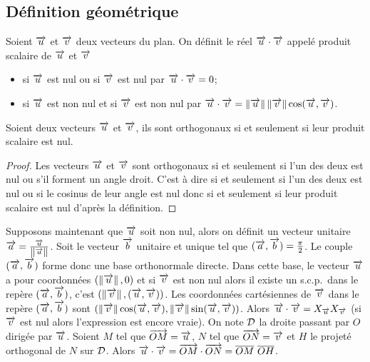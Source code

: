\subsection{Définition géométrique}
\begin{defdef}
  Soient $\vu$ et $\vv$ deux vecteurs du plan. On définit le réel $\vu \cdot \vv$ appelé produit scalaire de $\vu$ et $\vv$ 
  \begin{itemize}
  \item si $\vu$ est nul ou si $\vv$ est nul par $\vu \cdot \vv=0$;
  \item si $\vu$ est non nul et si $\vv$ est non nul par $\vu \cdot \vv=\norme{\vu}\norme{\vv}\cos(\vu, \vv)$.
  \end{itemize}
\end{defdef}
\begin{prop}
   Soient deux vecteurs $\vu$ et $\vv$, ils sont orthogonaux si et seulement si leur produit scalaire est nul.
\end{prop}
\begin{proof}
Les vecteurs $\vu$ et $\vv$ sont orthogonaux si et seulement si l'un des deux est nul ou s'il forment un angle droit. C'est à dire si et seulement si l'un des deux est nul ou si le cosinus de leur angle est nul donc si et seulement si leur produit scalaire est nul d'après la définition.
\end{proof}

Supposons maintenant que $\vu$ soit non nul, alors on définit un vecteur unitaire $\vect{a}=\frac{\vu}{\norme{\vu}}$. Soit le vecteur $\vect{b}$ unitaire et unique tel que $(\vect{a},\vect{b})=\frac{\pi}{2}$. Le couple $(\vect{a},\vect{b})$ forme donc une base orthonormale directe. Dans cette base, le vecteur $\vu$ a pour coordonnées $(\norme{\vu},0)$ et si $\vv$ est non nul alors il existe un s.c.p.\ dans le repère $(\vect{a},\vect{b})$, c'est $(\norme{\vv}, (\vu,\vv))$. Les coordonnées cartésiennes de $\vv$ dans le repère $(\vect{a},\vect{b})$ sont $(\norme{\vv}\cos(\vu,\vv),\norme{\vv}\sin(\vu,\vv))$. Alors $\vu \cdot \vv=X_{\vu}X_{\vv}$ (si $\vv$ est nul alors l'expression est encore vraie). On note $\Dr$ la droite passant par $O$ dirigée par $\vu$. Soient $M$ tel que $\vect{OM}=\vu$, $N$ tel que $\vect{ON}=\vv$ et $H$ le projeté orthogonal de $N$ sur $\Dr$. Alors $\vu \cdot \vv=\vect{OM} \cdot \vect{ON}= \overline{OM}~\overline{OH}$.

